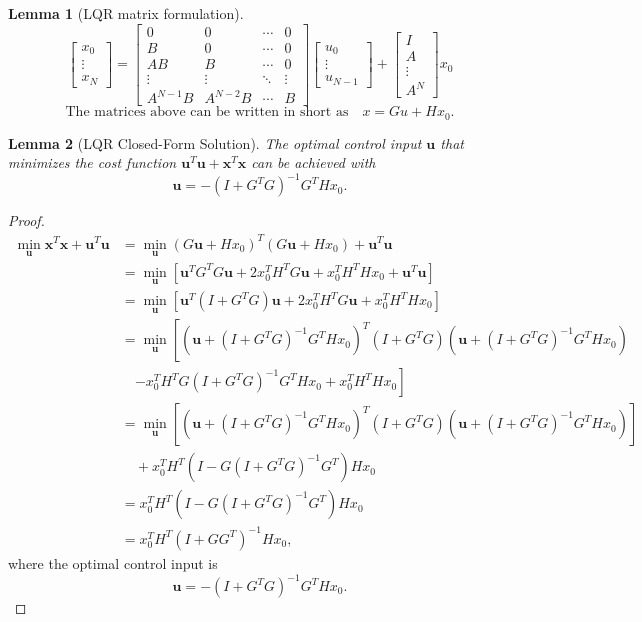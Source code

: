 \documentclass[a4 paper]{article}
\numberwithin{equation}{section}
\theoremstyle{boldStyle}
\theoremstyle{boldBlueStyle}
\newtheorem{lemma}{Lemma}[section]
\theoremstyle{boldPurpleStyle}
\theoremstyle{boldRedStyle}
\theoremstyle{boldGreenStyle}
\begin{document}
\begin{lemma}[LQR matrix formulation]
  \[
\begin{bmatrix}
x_0 \\
\vdots \\
x_N
\end{bmatrix}
=
\begin{bmatrix}
0 & 0 & \cdots & 0 \\
B & 0 & \cdots & 0 \\
AB & B & \cdots & 0 \\
\vdots & \vdots & \ddots & \vdots \\
A^{N-1}B & A^{N-2}B & \cdots & B
\end{bmatrix}
\begin{bmatrix}
u_0 \\
\vdots \\
u_{N-1}
\end{bmatrix}
+
\begin{bmatrix}
I \\
A \\
\vdots \\
A^N
\end{bmatrix}
x_0
\]
\[
\text{The matrices above can be written in short as} \quad x = Gu + Hx_0.
\]
\end{lemma}

\begin{lemma}[LQR Closed-Form Solution]
  The optimal control input \( \mathbf{u} \) that minimizes the cost function \( \mathbf{u}^T \mathbf{u} + \mathbf{x}^T \mathbf{x} \) can be achieved with
  \[
  \mathbf{u} = -(I + G^T G)^{-1} G^T H x_0.
  \]
\end{lemma}

\begin{proof}
  \begin{align*}
  \min_{\mathbf{u}} \mathbf{x}^T \mathbf{x} + \mathbf{u}^T \mathbf{u} &= \min_{\mathbf{u}} (G\mathbf{u} + H x_0)^T (G\mathbf{u} + H x_0) + \mathbf{u}^T \mathbf{u} \\
  &= \min_{\mathbf{u}} \left[ \mathbf{u}^T G^T G \mathbf{u} + 2 x_0^T H^T G \mathbf{u} + x_0^T H^T H x_0 + \mathbf{u}^T \mathbf{u} \right] \\
  &= \min_{\mathbf{u}} \left[ \mathbf{u}^T (I + G^T G) \mathbf{u} + 2 x_0^T H^T G \mathbf{u} + x_0^T H^T H x_0 \right] \\
  &= \min_{\mathbf{u}} \left[ (\mathbf{u} + (I + G^T G)^{-1} G^T H x_0)^T (I + G^T G) (\mathbf{u} + (I + G^T G)^{-1} G^T H x_0) \right. \\
  & \quad \left. - x_0^T H^T G (I + G^T G)^{-1} G^T H x_0 + x_0^T H^T H x_0 \right] \\
  &= \min_{\mathbf{u}} \left[ (\mathbf{u} + (I + G^T G)^{-1} G^T H x_0)^T (I + G^T G) (\mathbf{u} + (I + G^T G)^{-1} G^T H x_0) \right] \\
  & \quad + x_0^T H^T (I - G (I + G^T G)^{-1} G^T) H x_0 \\
  &= x_0^T H^T (I - G (I + G^T G)^{-1} G^T) H x_0 \\
  &= x_0^T H^T (I + G G^T)^{-1} H x_0,
  \end{align*}
  where the optimal control input is
  \[
  \mathbf{u} = -(I + G^T G)^{-1} G^T H x_0.
  \]
\end{proof}
      
\end{document}
